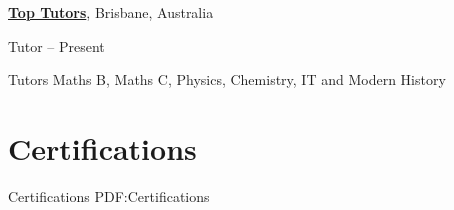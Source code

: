\documentclass[a4paper,10pt,oneside]{article}
\begin{document}
\begin{body}
\href{https://www.toptutors.com.au/}{\textbf{Top Tutors}}, Brisbane, Australia
\par Tutor \hfill {} -- Present
\begin{detail}
Tutors Maths B, Maths C, Physics, Chemistry, IT and Modern History
\end{detail}












\section
{Certifications}
{Certifications}
{PDF:Certifications}



\end{body}
\end{document}
